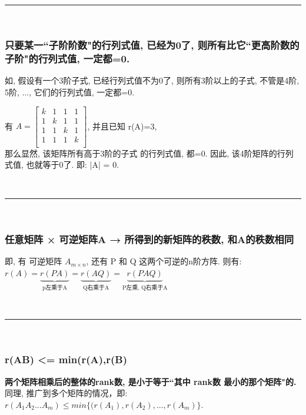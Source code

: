 \documentclass[UTF8]{ctexart}
\begin{document}
{~\\
\hrule
~\\


\subsubsection{只要某一``子阶阶数"的行列式值, 已经为0了, 则所有比它``更高阶数的子阶"的行列式值, 一定都=0.}

\begin{myEnvSample}
如, 假设有一个3阶子式, 已经行列式值不为0了, 则所有3阶以上的子式, 不管是4阶, 5阶, ..., 它们的行列式值, 一定都=0.
\end{myEnvSample}


\begin{myEnvSample}
有 
$
	A=\left[ \begin{matrix}
		k&		1&		1&		1\\
		1&		k&		1&		1\\
		1&		1&		k&		1\\
		1&		1&		1&		k\\
	\end{matrix} \right]
$, 并且已知 r(A)=3, \\
那么显然, 该矩阵所有高于3阶的子式 的行列式值, 都=0. 因此, 该4阶矩阵的行列式值, 也就等于0了. 即:  |A| = 0.
\end{myEnvSample}


~\\
\hrule
~\\


\subsubsection{任意矩阵 × 可逆矩阵A  → 所得到的新矩阵的秩数, 和A的秩数相同}

即, 有 可逆矩阵 $ A_{m \times n}$, 还有 P 和 Q 这两个可逆的n阶方阵. 则有:\\
$r\left( A \right) =\underset{\text{p左乘于A}}{\underbrace{r\left( PA \right) }}=\underset{\text{Q右乘于A}}{\underbrace{r\left( AQ \right) }}=\underset{\text{P左乘, Q右乘于A}}{\underbrace{r\left( PAQ \right) }}$


~\\
\hrule
~\\


\subsubsection{r(AB) <= min{(r(A),r(B)}}

\textbf{两个矩阵相乘后的整体的rank数, 是小于等于``其中 rank数 最小的那个矩阵"的.} \\
同理, 推广到多个矩阵的情况，即: $ r(A_1 A_2 ... A_m) \leq min\{(r(A_1),r(A_2),...,r(A_m)\}$.


}
\end{document}
